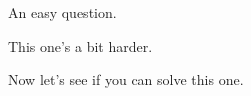 \documentclass{article}
\begin{document}
\begin{exercise}[difficulty=easy]
  An easy question.
\end{exercise}
\begin{exercise}[difficulty=medium]
  This one’s a bit harder.
\end{exercise}
\begin{exercise}[difficulty=hard]
  Now let’s see if you can solve this one.
\end{exercise}
\end{document}
